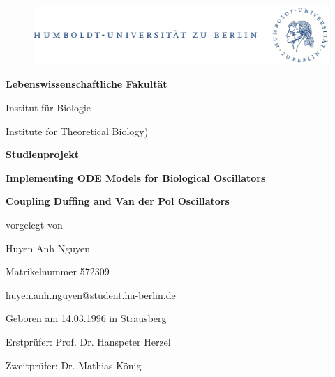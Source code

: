 \documentclass[oneside,10pt,a4paper]{report}
\begin{document}
	
	\begin{titlepage}
		
		
	
		
		\begin{center}
			\begin{figure}[h!tbp]
				\includegraphics[width=\linewidth]{HUlogo.PNG}
			\end{figure}
		\end{center}
			
			
			\textcolor{Greyish}{\textbf{Lebenswissenschaftliche Fakultät}}\par
			\textcolor{Greyish}{Institut für Biologie}\par
			\textcolor{Greyish}{Institute for Theoretical Biology)}\par
			\vspace*{4 cm}
		\begin{center}
			
			\textcolor{softbluetitle}{\textbf{\Large Studienprojekt}}\par
			\vspace*{1 cm}
			\textcolor{Bluetitle}{\textbf{\Huge Implementing ODE Models for Biological Oscillators}}\par
			\vspace*{1 cm}
			\textcolor{softbluetitle}{\textbf{\Large Coupling Duffing and Van der Pol Oscillators}}\par
			
		\end{center}
			\vspace*{4cm}
		
			
			
			\vspace*{0.5cm}
			\textcolor{Greyish}{vorgelegt von}\par
			\vspace*{0.5cm}
			\textcolor{Greyish}{Huyen Anh Nguyen}\par
			\textcolor{Greyish}{Matrikelnummer 572309}\par
			\textcolor{Greyish}{huyen.anh.nguyen@student.hu-berlin.de}\par
			\textcolor{Greyish}{Geboren am 14.03.1996 in Strausberg}\par
			\vspace*{0.5cm}
			\textcolor{Greyish}{Erstprüfer:		Prof. Dr. Hanspeter Herzel}\par
			\textcolor{Greyish}{Zweitprüfer:		Dr. Mathias König}\par
			
			
			
	
	\end{titlepage}
	
\end{document}
